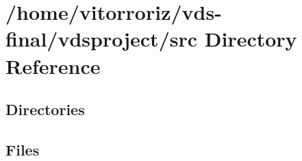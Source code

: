 \section{/home/vitorroriz/vds-\/final/vdsproject/src Directory Reference}
\label{dir_68267d1309a1af8e8297ef4c3efbcdba}
\subsection*{Directories}
\begin{DoxyCompactItemize}
\end{DoxyCompactItemize}
\subsection*{Files}
\begin{DoxyCompactItemize}
\end{DoxyCompactItemize}
